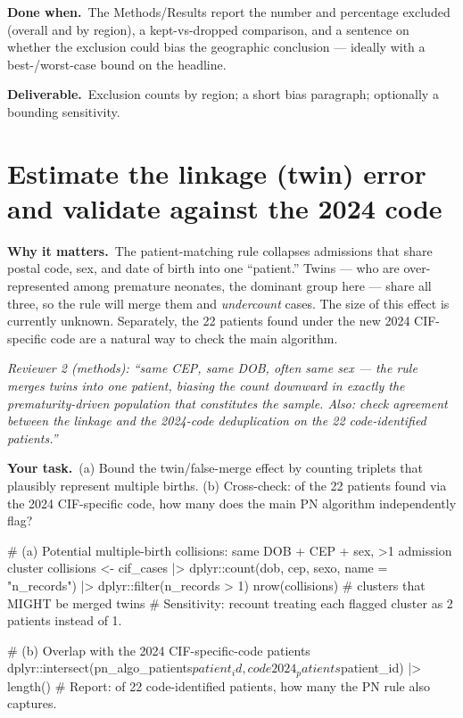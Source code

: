 \documentclass[11pt,a4paper]{article}
\newenvironment{reviewer}%
  {\def\FrameCommand{{\color{rulegray}\vrule width 1.5pt}\hspace{6pt}%
     \colorbox{quotebg}}%
   \MakeFramed{\advance\hsize-\width \FrameRestore}\small\itshape}%
  {\endMakeFramed}
\newcommand{\why}{\textbf{Why it matters.}\ }
\newcommand{\task}{\textbf{Your task.}\ }
\newcommand{\done}{\textbf{Done when.}\ }
\newcommand{\out}{\textbf{Deliverable.}\ }
\begin{document}
\done The Methods/Results report the number and percentage excluded (overall and by region), a
kept-vs-dropped comparison, and a sentence on whether the exclusion could bias the geographic
conclusion --- ideally with a best-/worst-case bound on the headline.

\out Exclusion counts by region; a short bias paragraph; optionally a bounding sensitivity.

\section{Estimate the linkage (twin) error and validate against the 2024 code}

\why The patient-matching rule collapses admissions that share postal code, sex, and date of
birth into one ``patient.'' Twins --- who are over-represented among premature neonates, the
dominant group here --- share all three, so the rule will merge them and \emph{undercount}
cases. The size of this effect is currently unknown. Separately, the 22 patients found under the
new 2024 CIF-specific code are a natural way to check the main algorithm.

\begin{reviewer}
Reviewer 2 (methods): ``same CEP, same DOB, often same sex --- the rule merges twins into one
patient, biasing the count downward in exactly the prematurity-driven population that
constitutes the sample. Also: check agreement between the linkage and the 2024-code
deduplication on the 22 code-identified patients.''
\end{reviewer}

\task (a) Bound the twin/false-merge effect by counting triplets that plausibly represent
multiple births. (b) Cross-check: of the 22 patients found via the 2024 CIF-specific code, how
many does the main PN algorithm independently flag?

\begin{Rcode}
# (a) Potential multiple-birth collisions: same DOB + CEP + sex, >1 admission cluster
collisions <- cif_cases |>
  dplyr::count(dob, cep, sexo, name = "n_records") |>
  dplyr::filter(n_records > 1)
nrow(collisions)                      # clusters that MIGHT be merged twins
# Sensitivity: recount treating each flagged cluster as 2 patients instead of 1.

# (b) Overlap with the 2024 CIF-specific-code patients
dplyr::intersect(pn_algo_patients$patient_id, code2024_patients$patient_id) |> length()
# Report: of 22 code-identified patients, how many the PN rule also captures.
\end{Rcode}
\end{document}
